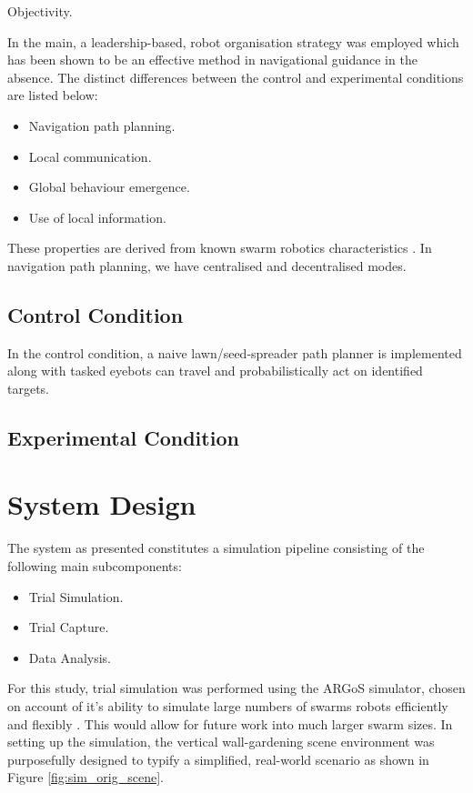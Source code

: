 \documentclass{report}
\begin{document}
Objectivity.

In the main, a leadership-based, robot organisation strategy was employed which has been shown \cite{Dyer2008} to be an effective method in navigational guidance in the absence. The distinct differences between the control and experimental conditions are listed below:
\begin{itemize}
	\item Navigation path planning.
	\item Local communication.
	\item Global behaviour emergence.
	\item Use of local information.
\end{itemize}

These properties are derived from known swarm robotics characteristics \cite{Dorigo2013}. In navigation path planning, we have centralised and decentralised modes.

\subsection{Control Condition}
In the control condition, a naive lawn/seed-spreader path planner \cite{Galceran2013} is implemented along with tasked eyebots can travel and probabilistically act on identified targets.
\subsection{Experimental Condition}

\section{System Design} \label{system_design}
The system as presented constitutes a simulation pipeline consisting of the following main subcomponents:
\begin{itemize}
	\item Trial Simulation.
	\item Trial Capture.
	\item Data  Analysis.
\end{itemize}

For this study, trial simulation was performed using the ARGoS simulator, chosen on account of it's ability to simulate large numbers of swarms robots efficiently and flexibly \cite{Pinciroli2014}. This would allow for future work into much larger swarm sizes. In setting up the simulation, the vertical wall-gardening scene environment was purposefully designed to typify a simplified, real-world scenario as shown in Figure \ref{fig:sim_orig_scene}.
\end{document}
